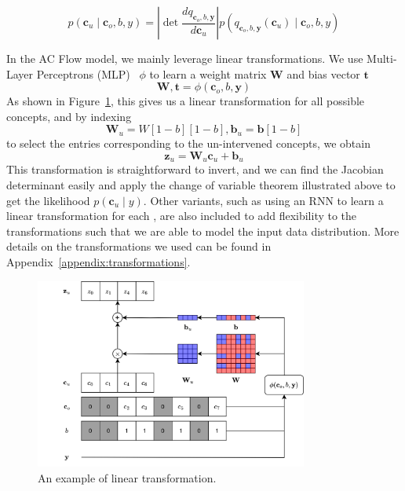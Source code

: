 \[p(\mathbf{c}_u \mid \mathbf{c}_o, b, y) = \left | 
\mathop{\mathrm{det}} \frac{d q_{\mathbf{c}_o, b, \mathbf{y}}}{d \mathbf{c}_u}
\right | p(q_{\mathbf{c}_o, b, \mathbf{y}}(\mathbf{c}_u) \mid \mathbf{c}_o, b, y)\]

In the AC Flow model, we mainly leverage
linear transformations. We use Multi-Layer Perceptrons (MLP)~\cite{feedforward} 
$\phi$ to learn 
a weight matrix $\mathbf{W}$ and bias vector $\mathbf{t}$
\[\mathbf{W}, \mathbf{t} = \phi(\mathbf{c}_o, b, \mathbf{y})\]
As shown in Figure~\ref{fig:linear-transformation},
this gives us a linear transformation for all possible concepts,
and by indexing 
\[\mathbf{W}_{u} = W[1-b][1-b], \mathbf{b}_{u} = \mathbf{b}[1-b]\]
to select the entries corresponding to the un-intervened concepts, we obtain
\[\mathbf{z}_u = \mathbf{W}_{u}\mathbf{c}_u + \mathbf{b}_{u}\]
 This transformation is 
straightforward to invert, and we can find the Jacobian determinant easily and apply the change of variable
theorem illustrated above to get the likelihood $p(\mathbf{c}_u \mid y)$.
Other variants, such as using an RNN to learn a linear transformation
for each , are also included to add flexibility to the transformations such that
we are able to model the input data distribution. More details on the transformations
we used can be found in Appendix~\ref{appendix:transformations}.

\begin{figure}[!ht]
    \centering
    \includegraphics[width=0.8\textwidth]{figs/method/transformations.png}
    \caption{An example of linear transformation.}
    \label{fig:linear-transformation}
\end{figure}

